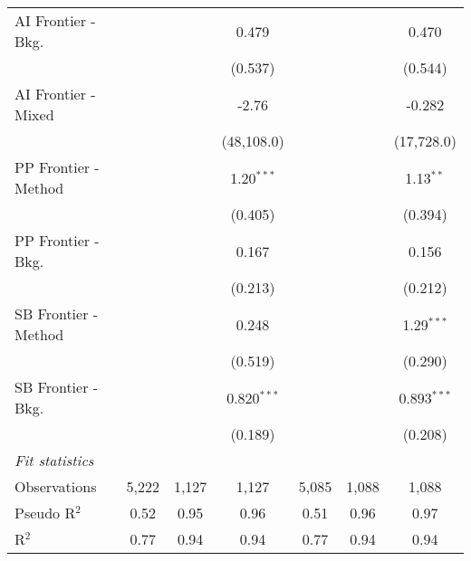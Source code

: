 \begin{tabular}{lcccccc}
   AI Frontier - Bkg.   &                &               & 0.479         &                &               & 0.470\\   
                        &                &               & (0.537)       &                &               & (0.544)\\   
   AI Frontier - Mixed  &                &               & -2.76         &                &               & -0.282\\   
                        &                &               & (48,108.0)    &                &               & (17,728.0)\\   
   PP Frontier - Method &                &               & 1.20$^{***}$  &                &               & 1.13$^{**}$\\   
                        &                &               & (0.405)       &                &               & (0.394)\\   
   PP Frontier - Bkg.   &                &               & 0.167         &                &               & 0.156\\   
                        &                &               & (0.213)       &                &               & (0.212)\\   
   SB Frontier - Method &                &               & 0.248         &                &               & 1.29$^{***}$\\   
                        &                &               & (0.519)       &                &               & (0.290)\\   
   SB Frontier - Bkg.   &                &               & 0.820$^{***}$ &                &               & 0.893$^{***}$\\   
                        &                &               & (0.189)       &                &               & (0.208)\\   
   \midrule
   \emph{Fit statistics}\\
   Observations         & 5,222          & 1,127         & 1,127         & 5,085          & 1,088         & 1,088\\  
   Pseudo R$^2$         & 0.52           & 0.95          & 0.96          & 0.51           & 0.96          & 0.97\\  
   R$^2$                & 0.77           & 0.94          & 0.94          & 0.77           & 0.94          & 0.94\\  
   

\end{tabular}
